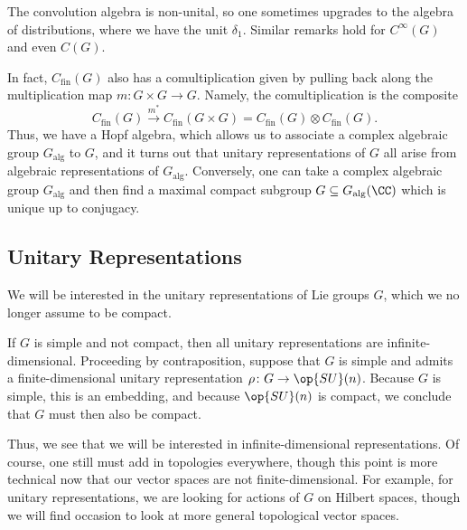 \documentclass[../notes.tex]{subfiles}
\begin{document}
\begin{remark}
	The convolution algebra is non-unital, so one sometimes upgrades to the algebra of distributions, where we have the unit $\delta_1$. Similar remarks hold for $C^\infty(G)$ and even $C(G)$.
\end{remark}
\begin{remark}
	In fact, $C_{\mathrm{fin}}(G)$ also has a comultiplication given by pulling back along the multiplication map $m\colon G\times G\to G$. Namely, the comultiplication is the composite
	\[C_{\mathrm{fin}}(G)\stackrel{m^*}\to C_{\mathrm{fin}}(G\times G)=C_{\mathrm{fin}}(G)\otimes C_{\mathrm{fin}}(G).\]
	Thus, we have a Hopf algebra, which allows us to associate a complex algebraic group $G_{\mathrm{alg}}$ to $G$, and it turns out that unitary representations of $G$ all arise from algebraic representations of $G_{\mathrm{alg}}$. Conversely, one can take a complex algebraic group $G_{\mathrm{alg}}$ and then find a maximal compact subgroup $G\subseteq G_{\mathrm{alg}}(\CC)$ which is unique up to conjugacy.
\end{remark}

\subsection{Unitary Representations}
We will be interested in the unitary representations of Lie groups $G$, which we no longer assume to be compact.
\begin{remark}
	If $G$ is simple and not compact, then all unitary representations are infinite-dimensional. Proceeding by contraposition, suppose that $G$ is simple and admits a finite-dimensional unitary representation $\rho\colon G\to\op{SU}(n)$. Because $G$ is simple, this is an embedding, and because $\op{SU}(n)$ is compact, we conclude that $G$ must then also be compact.
\end{remark}
Thus, we see that we will be interested in infinite-dimensional representations. Of course, one still must add in topologies everywhere, though this point is more technical now that our vector spaces are not finite-dimensional. For example, for unitary representations, we are looking for actions of $G$ on Hilbert spaces, though we will find occasion to look at more general topological vector spaces.
\end{document}
